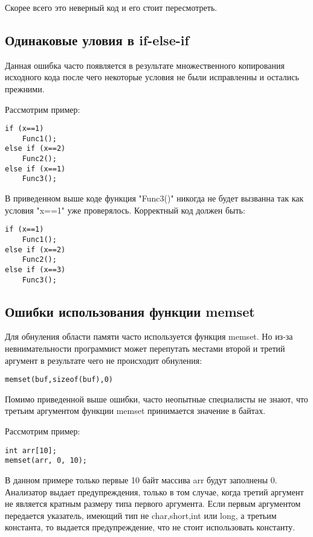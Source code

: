 Скорее всего это неверный код и его стоит пересмотреть.

\subsection{Одинаковые уловия в if-else-if}
\label{sec:eqCond}
Данная ошибка часто появляется в результате множественного копирования исходного кода после чего 
некоторые условия не были исправленны и остались прежними.

Рассмотрим пример:
\begin{lstlisting}
if (x==1)
	Func1();
else if (x==2)
	Func2();
else if (x==1)
	Func3();
\end{lstlisting}

В приведенном выше коде функция "Func3()" никогда не будет вызванна так как условия "x==1" уже
проверялось. Корректный код должен быть:
\begin{lstlisting}
if (x==1)
	Func1();
else if (x==2)
	Func2();
else if (x==3)
	Func3();
\end{lstlisting}

\subsection{Ошибки использования функции memset}
\label{sec:memset}
Для обнуления области памяти часто используется функция memset. Но из-за невнимательности программист может 
перепутать местами второй и третий аргумент в результате чего не происходит обнуления:
\begin{lstlisting}
memset(buf,sizeof(buf),0)
\end{lstlisting}
Помимо приведенной выше ошибки, часто неопытные специалисты не знают, что третьим аргументом 
функции memset принимается значение в байтах.

Рассмотрим пример:
\begin{lstlisting}
int arr[10];
memset(arr, 0, 10);
\end{lstlisting}
В данном примере только первые 10 байт массива arr будут заполнены 0. Анализатор выдает предупреждения, 
только в том случае, когда третий аргумент не является кратным размеру типа первого аргумента. 
Если первым аргументом передается указатель, имеющий тип не char,short,int или long, а третьим константа, то
выдается предупреждение, что не стоит использовать константу.

